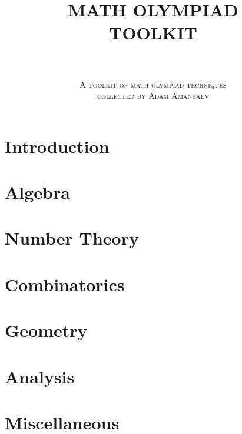 \documentclass[titlepage]{article}
\title{
    \textbf{MATH OLYMPIAD \\
    TOOLKIT}
}
\author{
    \rule{6cm}{0.2mm} \\[0.7cm]
    \small \scshape{A toolkit of math olympiad techniques} \\
    \small \scshape{collected by Adam Amanbaev}
}
\begin{document}
\maketitle

\newpage

\tableofcontents

\newpage

\section{Introduction}

\newpage

\section{Algebra}

\newpage

\section{Number Theory}

\newpage

\section{Combinatorics}

\newpage

\section{Geometry}

\newpage

\section{Analysis}

\newpage

\section{Miscellaneous}

\newpage
\end{document}
